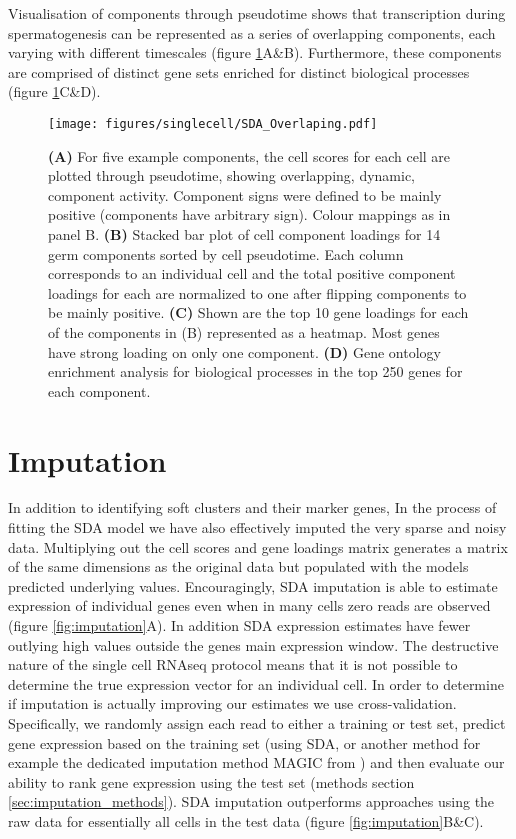 Visualisation of components through pseudotime shows that transcription during spermatogenesis can be represented as a series of overlapping components, each varying with different timescales (figure \ref{fig:SDA_overlapping}A\&B).
Furthermore, these components are comprised of distinct gene sets enriched for distinct biological processes (figure \ref{fig:SDA_overlapping}C\&D).

\begin{figure}[H]
	\centering
	\texttt{[image: figures/singlecell/SDA\_Overlaping.pdf]}
	\caption[Overlapping SDA Components]{
		\textbf{(A)} For five example components, the cell scores for each cell are plotted through pseudotime, showing overlapping, dynamic, component activity.
			Component signs were defined to be mainly positive (components have arbitrary sign).
			Colour mappings as in panel B.
		\textbf{(B)} Stacked bar plot of cell component loadings for 14 germ components sorted by cell pseudotime.
			Each column corresponds to an individual cell and the total positive component loadings for each are normalized to one after flipping components to be mainly positive.
		\textbf{(C)} Shown are the top 10 gene loadings for each of the components in (B) represented as a heatmap.
			Most genes have strong loading on only one component.
		\textbf{(D)} Gene ontology enrichment analysis for biological processes in the top 250 genes for each component.}
	\label{fig:SDA_overlapping}
\end{figure}


\section{Imputation}

In addition to identifying soft clusters and their marker genes, In the process of fitting the SDA model we have also effectively imputed the very sparse and noisy data.
Multiplying out the cell scores and gene loadings matrix generates a matrix of the same dimensions as the original data but populated with the models predicted underlying values.
Encouragingly, SDA imputation is able to estimate expression of individual genes even when in many cells zero reads are observed (figure \ref{fig:imputation}A).
In addition SDA expression estimates have fewer outlying high values outside the genes main expression window.
The destructive nature of the single cell RNAseq protocol means that it is not possible to determine the true expression vector for an individual cell.
In order to determine if imputation is actually improving our estimates we use cross-validation.
Specifically, we randomly assign each read to either a training or test set, predict gene expression based on the training set (using SDA, or another method for example the dedicated imputation method MAGIC from \cite{vanDijk2018Recovering}) and then evaluate our ability to rank gene expression using the test set (methods section \ref{sec:imputation_methods}).
SDA imputation outperforms approaches using the raw data for essentially all cells in the test data (figure \ref{fig:imputation}B\&C).

